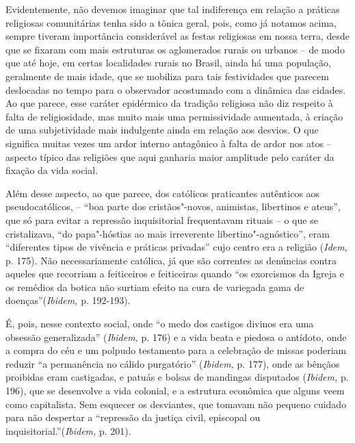 Evidentemente, não devemos imaginar que tal indiferença em relação a
práticas religiosas comunitárias tenha sido a tônica geral, pois, como
já notamos acima, sempre tiveram importância considerável as festas
religiosas em nossa terra, desde que se fixaram com mais estruturas os
aglomerados rurais ou urbanos -- de modo que até hoje, em certas
localidades rurais no Brasil, ainda há uma população, geralmente de mais
idade, que se mobiliza para tais festividades que parecem deslocadas no
tempo para o observador acostumado com a dinâmica das cidades. Ao que
parece, esse caráter epidérmico da tradição religiosa não diz respeito à
falta de religiosidade, mas muito mais uma permissividade aumentada, à
criação de uma subjetividade mais indulgente ainda em relação aos
desvios. O que significa muitas vezes um ardor interno antagônico à
falta de ardor nos atos -- aspecto típico das religiões que aqui
ganharia maior amplitude pelo caráter da fixação da vida social.

Além desse aspecto, ao que parece, dos católicos praticantes autênticos
aos pseudocatólicos, -- ``boa parte dos cristãos"-novos, animistas,
libertinos e ateus'', que só para evitar a repressão inquisitorial
frequentavam rituais -- o que se cristalizava, ``do papa"-hóstias ao mais
irreverente libertino"-agnóstico'', eram ``diferentes tipos de vivência e
práticas privadas'' cujo centro era a religião (\emph{Idem}, p. 175).
Não necessariamente católica, já que são correntes as denúncias contra
aqueles que recorriam a feiticeiros e feiticeiras quando ``os exorcismos
da Igreja e os remédios da botica não surtiam efeito na cura de
variegada gama de doenças''(\emph{Ibidem,} p. 192-193).

É, pois, nesse contexto social, onde ``o medo dos castigos divinos era
uma obsessão generalizada'' (\emph{Ibidem,} p. 176) e a vida beata e
piedosa o antídoto, onde a compra do céu e um polpudo testamento para a
celebração de missas poderiam reduzir ``a permanência no cálido
purgatório'' (\emph{Ibidem,} p. 177), onde as bênçãos proibidas eram
castigadas, e patuás e bolsas de mandingas disputados (\emph{Ibidem,} p.
196), que se desenvolve a vida colonial, e a estrutura econômica que
alguns veem como capitalista. Sem esquecer os desviantes, que tomavam
não pequeno cuidado para não despertar a ``repressão da justiça civil,
episcopal ou inquisitorial.''(\emph{Ibidem,} p. 201).

